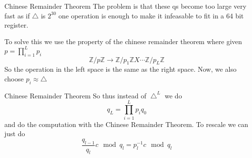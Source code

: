 \documentclass{beamer}
\begin{document}
	\begin{frame}{Chinese Remainder Theorem}
		The problem is that these qs become too large very fast as if $\bigtriangleup$ is $2^{30}$ one operation is enough to make it infeasable to fit in a 64 bit register.
		
		To solve this we use the property of the chinese remainder theorem where given $p=\prod_{i=1}^{L}p_i$
		\begin{equation*}
			\mathbb{Z}/p\mathbb{Z}\to\mathbb{Z}/p_1\mathbb{Z}X\cdots\mathbb{Z}/p_L\mathbb{Z}
		\end{equation*}
		So the operation in the left space is the same as the right space. Now, we also choose $p_i \approx \bigtriangleup$
	\end{frame}
	\begin{frame}{Chinese Remainder Theorem}
		So thus instead of $\bigtriangleup^L$ we do
		\begin{equation*}
			q_{L} = \prod_{i=1}^{L}p_i q_0
		\end{equation*}
		and do the computation with the Chinese Remainder Theorem. To rescale we can just do
		\begin{equation*}
			\dfrac{q_{l-1}}{q_l}c \mod q_l = p_l^{-1} c \mod q_l
		\end{equation*}
	\end{frame}
\end{document}

